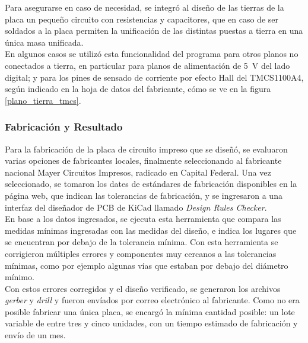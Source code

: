 Para asegurarse en caso de necesidad, se integró al diseño de las tierras de la placa un pequeño circuito con resistencias y capacitores, que en caso de ser soldados a la placa permiten la unificación de las distintas puestas a tierra en una única masa unificada.\\

En algunos casos se utilizó esta funcionalidad del programa para otros planos
no conectados a tierra, en particular para planos de alimentación de \SI[]{5}{\volt} del lado digital; y para los pines de sensado de corriente por efecto Hall del TMCS1100A4, según indicado en la hoja de datos del fabricante, cómo se ve en la figura \ref{plano_tierra_tmcs}.

\subsubsection{Fabricación y Resultado}

Para la fabricación de la placa de circuito impreso que se diseñó, se evaluaron varias opciones de fabricantes locales, finalmente seleccionando al fabricante nacional {\Medium Mayer Circuitos Impresos}, radicado en Capital Federal. Una vez seleccionado, se tomaron los dates de estándares de fabricación disponibles en la página web, que indican las tolerancias de fabricación, y se ingresaron a una interfaz del diseñador de PCB de KiCad llamado \textit{Design Rules Checker}.\\

En base a los datos ingresados, se ejecuta esta herramienta que compara las medidas mínimas ingresadas con las medidas del diseño, e indica los lugares que se encuentran por debajo de la tolerancia mínima. Con esta herramienta se corrigieron múltiples errores y componentes muy cercanos a las tolerancias mínimas, como por ejemplo algunas vías que estaban por debajo del diámetro mínimo.\\

Con estos errores corregidos y el diseño verificado, se generaron los archivos \textit{gerber} y \textit{drill} y fueron envíados por correo electrónico al fabricante. Como no era posible fabricar una única placa, se encargó la mínima cantidad posible: un lote variable de entre tres y cinco unidades, con un tiempo estimado de fabricación y envío de un mes.\\

